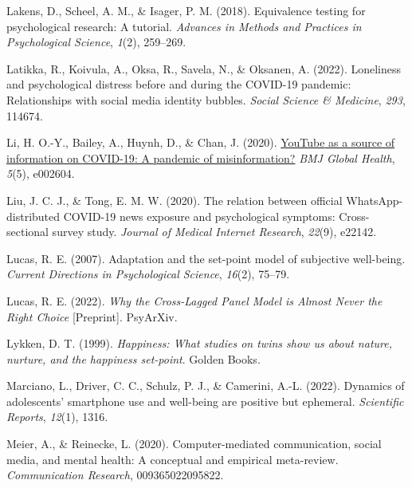 \documentclass[
  man,mask,floatsintext]{apa7}
\newlength{\cslhangindent}
\newlength{\cslentryspacingunit} %
\newenvironment{CSLReferences}[2] %
 {%
  \setlength{\parindent}{0pt}
  \ifodd #1
  \let\oldpar\par
  \def\par{\hangindent=\cslhangindent\oldpar}
  \fi
  \setlength{\parskip}{#2\cslentryspacingunit}
 }%
 {}
\begin{document}
\begin{CSLReferences}{1}{0}
\leavevmode{}%
Lakens, D., Scheel, A. M., \& Isager, P. M. (2018). Equivalence testing for psychological research: {A} tutorial. \emph{Advances in Methods and Practices in Psychological Science}, \emph{1}(2), 259--269.

\leavevmode{}%
Latikka, R., Koivula, A., Oksa, R., Savela, N., \& Oksanen, A. (2022). Loneliness and psychological distress before and during the {COVID-19} pandemic: {Relationships} with social media identity bubbles. \emph{Social Science \& Medicine}, \emph{293}, 114674.

\leavevmode{}%
Li, H. O.-Y., Bailey, A., Huynh, D., \& Chan, J. (2020). \href{https://www.ncbi.nlm.nih.gov/pubmed/32409327}{{YouTube} as a source of information on {COVID-19}: A pandemic of misinformation?} \emph{BMJ Global Health}, \emph{5}(5), e002604.

\leavevmode{}%
Liu, J. C. J., \& Tong, E. M. W. (2020). The relation between official {WhatsApp-distributed COVID-19} news exposure and psychological symptoms: Cross-sectional survey study. \emph{Journal of Medical Internet Research}, \emph{22}(9), e22142.

\leavevmode{}%
Lucas, R. E. (2007). Adaptation and the set-point model of subjective well-being. \emph{Current Directions in Psychological Science}, \emph{16}(2), 75--79.

\leavevmode{}%
Lucas, R. E. (2022). \emph{Why the {Cross-Lagged Panel Model} is {Almost Never} the {Right Choice}} {[}Preprint{]}. {PsyArXiv}.

\leavevmode{}%
Lykken, D. T. (1999). \emph{Happiness: {What} studies on twins show us about nature, nurture, and the happiness set-point}. {Golden Books}.

\leavevmode{}%
Marciano, L., Driver, C. C., Schulz, P. J., \& Camerini, A.-L. (2022). Dynamics of adolescents' smartphone use and well-being are positive but ephemeral. \emph{Scientific Reports}, \emph{12}(1), 1316.

\leavevmode{}%
Meier, A., \& Reinecke, L. (2020). Computer-mediated communication, social media, and mental health: {A} conceptual and empirical meta-review. \emph{Communication Research}, 009365022095822.


\end{CSLReferences}
\end{document}
